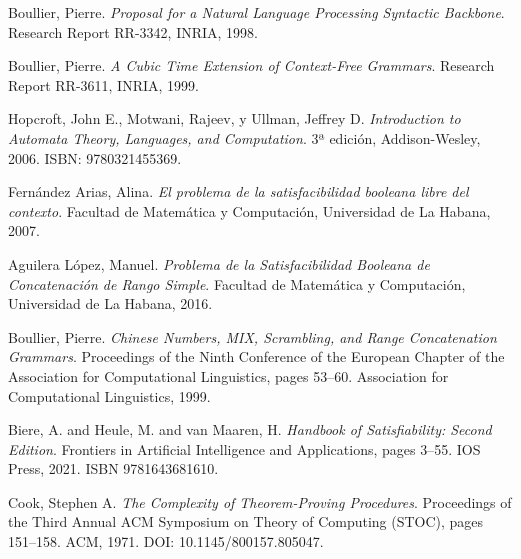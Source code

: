 \documentclass{article}
\begin{document}
\begin{thebibliography}{99}

    Boullier, Pierre.
    \textit{Proposal for a Natural Language Processing Syntactic Backbone}.
    Research Report RR-3342, INRIA, 1998.

    Boullier, Pierre.
    \textit{A Cubic Time Extension of Context-Free Grammars}.
    Research Report RR-3611, INRIA, 1999.

    Hopcroft, John E., Motwani, Rajeev, y Ullman, Jeffrey D.
    \textit{Introduction to Automata Theory, Languages, and Computation}.
    3ª edición, Addison-Wesley, 2006. ISBN: 9780321455369.

    Fernández Arias, Alina.
    \textit{El problema de la satisfacibilidad booleana libre del contexto}.
    Facultad de Matemática y Computación, Universidad de La Habana, 2007.

    Aguilera López, Manuel.
    \textit{Problema de la Satisfacibilidad Booleana de Concatenación de Rango Simple}.
    Facultad de Matemática y Computación, Universidad de La Habana, 2016.

    Boullier, Pierre.
    \textit{Chinese Numbers, MIX, Scrambling, and Range Concatenation Grammars}.
    Proceedings of the Ninth Conference of the European Chapter of the Association for Computational Linguistics, pages 53--60. Association for Computational Linguistics, 1999.

    Biere, A. and Heule, M. and van Maaren, H.
    \textit{Handbook of Satisfiability: Second Edition}.
    Frontiers in Artificial Intelligence and Applications, pages 3--55. IOS Press, 2021.
    ISBN 9781643681610.

    Cook, Stephen A.
    \textit{The Complexity of Theorem-Proving Procedures}.
    Proceedings of the Third Annual ACM Symposium on Theory of Computing (STOC), pages 151--158. ACM, 1971.
    DOI: 10.1145/800157.805047.

\end{thebibliography}
\end{document}

